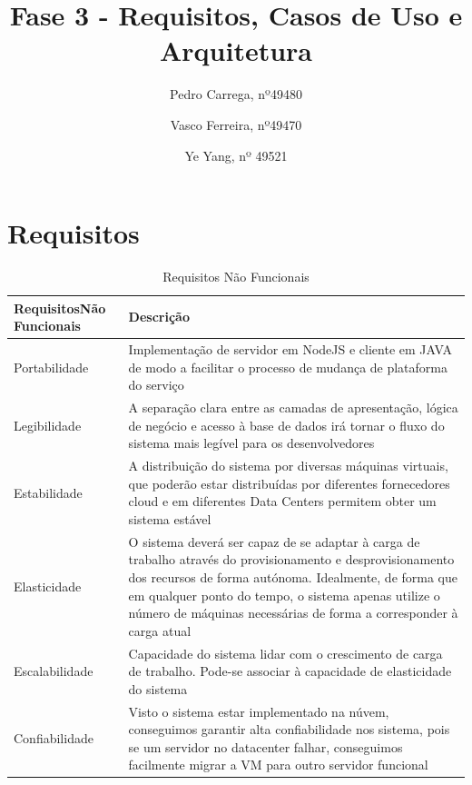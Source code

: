 \documentclass[11pt,a4paper]{article}
\begin{document}
\title{Fase 3 - Requisitos, Casos de Uso e Arquitetura}
\author{Pedro Carrega, nº49480 \and
Vasco Ferreira, nº49470 \and Ye Yang, nº 49521
}


\maketitle

\section{Requisitos}

\begin{table}[H]
	\begin{center}
		\begin{tabular}{|p{3.5cm}|p{9.5cm}|}
		\hline
			\textbf{Requisitos\newline Não Funcionais} & \textbf{Descrição}\\ \hline
			Portabilidade & Implementação de servidor em NodeJS e cliente em JAVA de modo a facilitar o processo de mudança de plataforma do serviço \\ \hline
			Legibilidade & A separação clara entre as camadas de apresentação, lógica de negócio e acesso à base de dados irá tornar o fluxo do sistema mais legível para os desenvolvedores \\ \hline
			Estabilidade & A distribuição do sistema por diversas máquinas virtuais, que poderão estar distribuídas por diferentes fornecedores cloud e em diferentes Data Centers permitem obter um sistema estável \\ \hline
			Elasticidade & O sistema deverá ser capaz de se adaptar à carga de trabalho através do provisionamento e desprovisionamento dos recursos de forma autónoma. Idealmente, de forma que em qualquer ponto do tempo, o sistema apenas utilize o número de máquinas necessárias de forma a corresponder à carga atual \\ \hline
			Escalabilidade & Capacidade do sistema lidar com o crescimento de carga de trabalho. Pode-se associar à capacidade de elasticidade do sistema \\ \hline
			Confiabilidade & Visto o sistema estar implementado na núvem, conseguimos garantir alta confiabilidade nos sistema, pois se um servidor no datacenter falhar, conseguimos facilmente migrar a VM para outro servidor funcional \\ \hline
	\end{tabular}
	\label{tab1}
	\end{center}
	\caption{Requisitos Não Funcionais}
\end{table}
\end{document}
